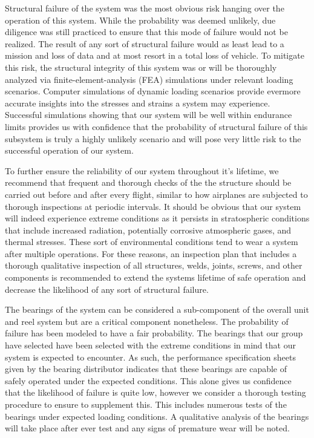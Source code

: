 Structural failure of the system was the most obvious risk hanging over the operation of this system. While the probability was deemed unlikely, due diligence was still practiced to ensure that this mode of failure would not be realized. The result of any sort of structural failure would as least lead to a mission and loss of data and at most resort in a total loss of vehicle. To mitigate this risk, the structural integrity of this system was or will be thoroughly analyzed via finite-element-analysis (FEA) simulations under relevant loading scenarios. Computer simulations of dynamic loading scenarios provide evermore accurate insights into the stresses and strains a system may experience. Successful simulations showing that our system will be well within endurance limits provides us with confidence that the probability of structural failure of this subsystem is truly a highly unlikely scenario and will pose very little risk to the successful operation of our system. 

To further ensure the reliability of our system throughout it's lifetime, we recommend that frequent and thorough checks of the the structure should be carried out before and after every flight, similar to how airplanes are subjected to thorough inspections at periodic intervals. It should be obvious that our system will indeed experience extreme conditions as it persists in stratospheric conditions that include increased radiation, potentially corrosive atmospheric gases, and thermal stresses. These sort of environmental conditions tend to wear a system after multiple operations. For these reasons, an inspection plan that includes a thorough qualitative inspection of all structures, welds, joints, screws, and other components is recommended to extend the systems lifetime of safe operation and decrease the likelihood of any sort of structural failure. 

The bearings of the system can be considered a sub-component of the overall unit and reel system but are a critical component nonetheless. The probability of failure has been modeled to have a fair probability. The bearings that our group have selected have been selected with the extreme conditions in mind that our system is expected to encounter. As such, the performance specification sheets given by the bearing distributor indicates that these bearings are capable of safely operated under the expected conditions. This alone gives us confidence that the likelihood of failure is quite low, however we consider a thorough testing procedure to ensure to supplement this. This includes numerous tests of the bearings under expected loading conditions. A qualitative analysis of the bearings will take place after ever test and any signs of premature wear will be noted. 

